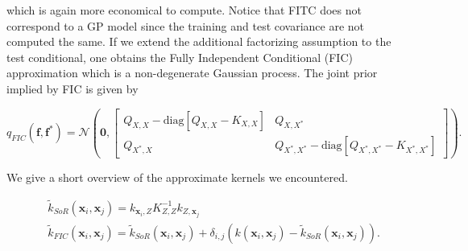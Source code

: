 \documentclass[12pt,a4paper,oneside]{book}
\begin{document}
which is again more economical to compute. Notice that FITC does not correspond to a GP model since the training and test covariance are not computed the same. If we extend the additional factorizing assumption to the test conditional, one obtains the Fully Independent Conditional (FIC) approximation which is a non-degenerate Gaussian process. The joint prior implied by FIC is given by

\begin{equation}
q_{FIC}(\bm{f},\bm{f}^{\ast}) = 
\mathcal{N} \left( \bm{0}, 
\begin{bmatrix}
    Q_{X,X} - \text{diag}[Q_{X,X} -K_{X,X}] & Q_{X,X^{\ast}}\\
    Q_{X^{\ast},X}  & Q_{X^{\ast},X^{\ast}} - \text{diag}[Q_{X^{\ast},X^{\ast}} -K_{X^{\ast},X^{\ast}}]
\end{bmatrix} 
\right).
\end{equation}

We give a short overview of the approximate kernels we encountered.

\begin{align}\label{sor_and_fic}
& \tilde{k}_{SoR} ({\bm{x}_i,\bm{x}_j}) = k_{\bm{x}_i,Z} K^{-1}_{Z,Z} k_{Z,\bm{x}_j} \\
& \tilde{k}_{FIC} ({\bm{x}_i,\bm{x}_j}) = \tilde{k}_{SoR} ({\bm{x}_i,\bm{x}_j}) + \delta_{i,j} \left( k ({\bm{x}_i,\bm{x}_j}) - \tilde{k}_{SoR} ({\bm{x}_i,\bm{x}_j}) \right).
\end{align}

\end{document}
